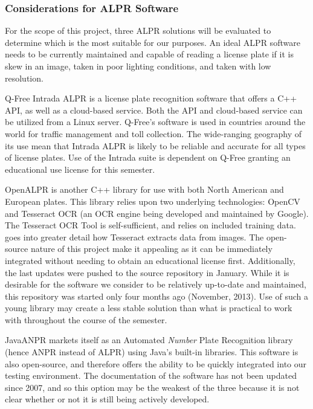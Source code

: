 \documentclass[11pt, oneside, fullpage, doublespace]{article}
\begin{document}
\subsubsection{Considerations for ALPR Software}
For the scope of this project, three ALPR solutions will be evaluated to determine which is the most suitable for our purposes. An ideal ALPR software needs to be currently maintained and capable of reading a license plate if it is skew in an image, taken in poor lighting conditions, and taken with low resolution.

Q-Free Intrada ALPR \cite{intrada2014} is a license plate recognition software that offers a C++ API, as well as a cloud-based service. Both the API and cloud-based service can be utilized from a Linux server. Q-Free's software is used in countries around the world for traffic management and toll collection. The wide-ranging geography of its use mean that Intrada ALPR is likely to be reliable and accurate for all types of license plates. Use of the Intrada suite is dependent on Q-Free granting an educational use license for this semester.

OpenALPR is another C++ library for use with both North American and European plates. This library relies upon two underlying technologies: OpenCV \cite{openCV} and Tesseract OCR (an OCR engine being developed and maintained by Google). The Tesseract OCR Tool is self-sufficient, and relies on included training data. \cite{patel2012} goes into greater detail how Tesseract extracts data from images. The open-source nature of this project make it appealing as it can be immediately integrated without needing to obtain an educational license first. Additionally, the last updates were pushed to the source repository in January. While it is desirable for the software we consider to be relatively up-to-date and maintained, this repository was started only four months ago (November, 2013). Use of such a young library may create a less stable solution than what is practical to work with throughout the course of the semester.

JavaANPR markets itself as an Automated \emph{Number} Plate Recognition library (hence ANPR instead of ALPR) using Java's built-in libraries. This software is also open-source, and therefore offers the ability to be quickly integrated into our testing environment. The documentation of the software has not been updated since 2007, and so this option may be the weakest of the three because it is not clear whether or not it is still being actively developed.
\end{document}

